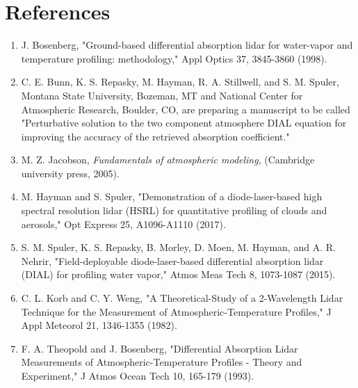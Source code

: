 \documentclass[twoside]{article}
\begin{document}
\section{References}
\begin{enumerate}
\item J. Bosenberg, "Ground-based differential absorption lidar for water-vapor and temperature profiling: methodology," Appl Optics 37, 3845-3860 (1998).

\item C. E. Bunn, K. S. Repasky, M. Hayman, R. A. Stillwell, and S. M. Spuler, Montana State University, Bozeman, MT and National Center for Atmospheric Research, Boulder, CO, are preparing a manuscript to be called "Perturbative solution to the two component atmosphere DIAL equation for improving the accuracy of the retrieved absorption coefficient."

\item M. Z. Jacobson, \textit{Fundamentals of atmospheric modeling}, (Cambridge university press, 2005).

\item M. Hayman and S. Spuler, "Demonstration of a diode-laser-based high spectral resolution lidar (HSRL) for quantitative profiling of clouds and aerosols," Opt Express 25, A1096-A1110 (2017).

\item S. M. Spuler, K. S. Repasky, B. Morley, D. Moen, M. Hayman, and A. R. Nehrir, "Field-deployable diode-laser-based differential absorption lidar (DIAL) for profiling water vapor," Atmos Meas Tech 8, 1073-1087 (2015).

\item C. L. Korb and C. Y. Weng, "A Theoretical-Study of a 2-Wavelength Lidar Technique for the Measurement of Atmospheric-Temperature Profiles," J Appl Meteorol 21, 1346-1355 (1982).

\item F. A. Theopold and J. Bosenberg, "Differential Absorption Lidar Measurements of Atmospheric-Temperature Profiles - Theory and Experiment," J Atmos Ocean Tech 10, 165-179 (1993).

\end{enumerate}


\end{document}
